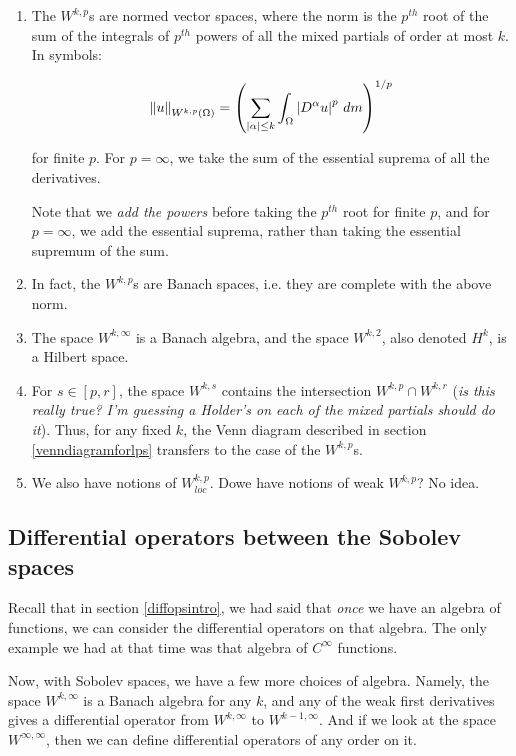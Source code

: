 \documentclass[a4paper]{amsart}
\newcommand{\norm}[1]{\left\|#1\right\|}
\begin{document}
\begin{enumerate}

\item The $W^{k,p}$s are normed vector spaces, where the norm is the
  $p^{th}$ root of the sum of the integrals of $p^{th}$ powers of all
  the mixed partials of order at most $k$. In symbols:

  $$\norm{u}_{W^{k,p}(\Omega)} = \left( \sum_{\abs{\alpha} \le k} \int_\Omega \abs{D^\alpha u}^p \, dm \right)^{1/p}$$

  for finite $p$. For $p = \infty$, we take the sum of the essential
  suprema of all the derivatives.

  Note that we {\em add the powers} before taking the $p^{th}$ root
  for finite $p$, and for $p = \infty$, we add the essential suprema,
  rather than taking the essential supremum of the sum.

\item In fact, the $W^{k,p}$s are Banach spaces, i.e. they are
  complete with the above norm.

\item The space $W^{k,\infty}$ is a Banach algebra, and the space
  $W^{k,2}$, also denoted $H^k$, is a Hilbert space.

\item For $s \in [p,r]$, the space $W^{k,s}$ contains the intersection
  $W^{k,p} \cap W^{k,r}$ ({\em is this really true? I'm guessing a
    Holder's on each of the mixed partials should do it}). Thus, for
  any fixed $k$, the Venn diagram described in section
  \ref{venndiagramforlps} transfers to the case of the $W^{k,p}$s.

\item We also have notions of $W^{k,p}_{loc}$. Dowe have notions of
  weak $W^{k,p}$? No idea.

\end{enumerate}

\subsection{Differential operators between the Sobolev spaces}

Recall that in section \ref{diffopsintro}, we had said that {\em once}
we have an algebra of functions, we can consider the differential
operators on that algebra. The only example we had at that time was
that algebra of $C^\infty$ functions.

Now, with Sobolev spaces, we have a few more choices of algebra.
Namely, the space $W^{k,\infty}$ is a Banach algebra for any $k$, and
any of the weak first derivatives gives a differential operator from
$W^{k,\infty}$ to $W^{k-1,\infty}$. And if we look at the space
$W^{\infty,\infty}$, then we can define differential operators of any
order on it.
\end{document}
